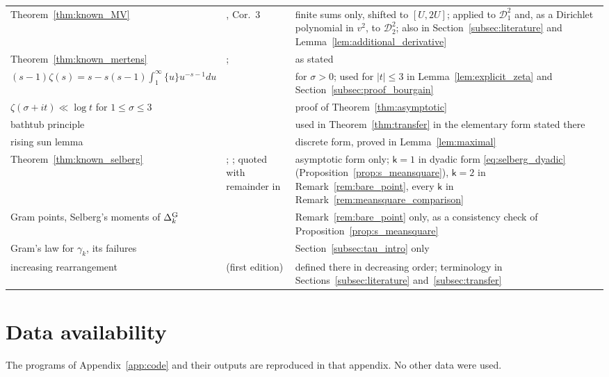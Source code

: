 \documentclass[11pt,a4paper]{article}
\makeatletter
\numberwithin{equation}{section}
\DeclareRobustCommand{\CGref}[1]{\ref{#1}}
\DeclareRobustCommand{\CGeqref}[1]{\eqref{#1}}
\DeclareRobustCommand{\CGcite}[2][]{\if\relax\detokenize{#1}\relax\cite{#2}\else\cite[#1]{#2}\fi}
\let\CG@origref\ref
\let\CG@origeqref\eqref
\newcommand{\CG@gettip}[1]{\@ifundefined{CGTip@#1}{#1}{\csname CGTip@#1\endcsname}}
\newcommand{\CG@getbib}[1]{\@ifundefined{CGBib@#1}{#1}{\csname CGBib@#1\endcsname}}
\DeclareRobustCommand{\CGref}[1]{\pdftooltip{\CG@origref{#1}}{\CG@gettip{#1}}}
\DeclareRobustCommand{\CGeqref}[1]{\pdftooltip{\CG@origeqref{#1}}{\CG@gettip{#1}}}
\DeclareRobustCommand{\CGcite}[2][]{\pdftooltip{\if\relax\detokenize{#1}\relax\cite{#2}\else\cite[#1]{#2}\fi}{\CG@getbib{#2}}}
\theoremstyle{definition}
\theoremstyle{remark}
\makeatother
\begin{document}
\begin{center}
\begin{longtable}{p{}p{}p{}}
Theorem~\CGref{thm:known_MV} & \CGcite{MontgomeryVaughan1974}, Cor.~3 & finite sums only, shifted to $[U,2U]$; applied to $\mathscr D_1^2$ and, as a Dirichlet polynomial in $v^2$, to $\mathscr D_2^2$; also in Section~\CGref{subsec:literature} and Lemma~\CGref{lem:additional_derivative}\\
Theorem~\CGref{thm:known_mertens} & \CGcite{Mertens1874}; \CGcite[Ch.~I.1]{Tenenbaum2015} & as stated\\
$(s-1)\zeta(s)=s-s(s-1)\int_1^\infty\{u\}u^{-s-1}du$ & \CGcite[(2.1.4)]{Titchmarsh1986} & for $\sigma>0$; used for $|t|\le3$ in Lemma~\CGref{lem:explicit_zeta} and Section~\CGref{subsec:proof_bourgain}\\
$\zeta(\sigma+it)\ll\log t$ for $1\le\sigma\le3$ & \CGcite[Thm.~3.5]{Titchmarsh1986} & proof of Theorem~\CGref{thm:asymptotic}\\
bathtub principle & \CGcite[Thm.~1.14]{LiebLoss2001} & used in Theorem~\CGref{thm:transfer} in the elementary form stated there\\
rising sun lemma & \CGcite{Riesz1932} & discrete form, proved in Lemma~\CGref{lem:maximal}\\
Theorem~\CGref{thm:known_selberg} & \CGcite{Selberg1946a}; \CGcite[Notes for Chapter~9, (9.25.1), p.~245]{Titchmarsh1986}; quoted with remainder in \CGcite[p.~225]{Fujii1974} & asymptotic form only; $\mathsf k=1$ in dyadic form \CGeqref{eq:selberg_dyadic} (Proposition~\CGref{prop:s_meansquare}), $\mathsf k=2$ in Remark~\CGref{rem:bare_point}, every $\mathsf k$ in Remark~\CGref{rem:meansquare_comparison}\\
Gram points, Selberg's moments of $\Delta^{\rm G}_k$ & \CGcite[Thm.~4.2]{Korolev2012} & Remark~\CGref{rem:bare_point} only, as a consistency check of Proposition~\CGref{prop:s_meansquare}\\
Gram's law for $\gamma_k$, its failures & \CGcite[Def.~1.4 and p.~58]{Korolev2012} & Section~\CGref{subsec:tau_intro} only\\
increasing rearrangement & \CGcite[\S10.12, pp.~276--278]{HardyLittlewoodPolya1934} (first edition) & defined there in decreasing order; terminology in Sections~\CGref{subsec:literature} and~\CGref{subsec:transfer}\\
\end{longtable}
\end{center}

\section*{Data availability}
The programs of Appendix~\CGref{app:code} and their outputs are reproduced in that appendix. No other data were used.
\end{document}
